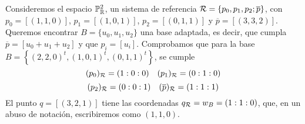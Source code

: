 
\begin{example}
    Consideremos el espacio $\mathbb{P}^2_{\mathbb{R}}$, un sistema de referencia $\mathcal{R} = \{ p_0, p_1, p_2; \overline{p}\}$, con 
    $p_0 = [(1, 1, 0)]$, $p_1 = [(1, 0, 1)]$, $p_2 = [(0, 1, 1)]$ y $\overline{p} = [(3,3,2)]$.
    Queremos encontrar $B = \{u_0, u_1, u_2\}$ una base adaptada, es decir, que cumpla $\overline{p} = [u_0+u_1+u_2]$
    y que $p_i = [u_i]$. Comprobamos que para la base $B = \left \{ (2,2,0)^t, (1,0,1)^t, (0,1,1)^t \right \}$, se cumple
    \[(p_0)_{\mathcal{R}} = (1:0:0) \quad (p_1)_{\mathcal{R}} = (0:1:0)\]
    \[(p_2)_{\mathcal{R}} = (0:0:1) \quad (\overline{p})_{\mathcal{R}} = (1:1:1)\]
    El punto $q = [(3, 2, 1)]$ tiene las coordenadas $q_{\mathcal{R}} = w_B = (1:1:0)$, que, en un abuso de notación,
    escribiremos como $(1, 1, 0)$.
\end{example}

